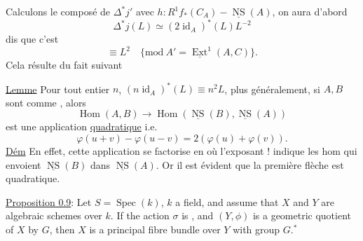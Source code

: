 Calculons  le composé  de $\Delta^*j'$ avec $h:R^1f_*(C_A)\mathbin{-}\underline{\operatorname{NS}}(A)$, on aura d'abord
\[
\Delta^*j(L)\simeq(2\operatorname{id}_A)^*(L)L^{-2}
\]
 dis que c'est
\[
\equiv L^2\quad\{\mathrm{mod}\ A'=\underline{\operatorname{Ext}}^1(A,C)\}.
\]
Cela résulte du fait suivant

\uline{Lemme} Pour tout entier $n$, $(n\operatorname{id}_A)^*(L)\equiv n^2L$,
 plus généralement, si $A,B$ sont comme , alors
\[
\operatorname{Hom}(A,B)\longrightarrow\operatorname{Hom}(\underline{\operatorname{NS}}(B),\underline{\operatorname{NS}}(A))
\]
est une application \uline{quadratique} i.e.
\[
\varphi(u+v)-\varphi(u-v)=2(\varphi(u)+\varphi(v)).
\]
 \uline{Dém} En effet, cette application se factorise en
où l'exposant ! indique les hom qui envoient $\underline{\operatorname{NS}}(B)$ dans $\underline{\operatorname{NS}}(A)$.  Or il est évident que la première flèche est quadratique.




\uline{Proposition 0.9}: Let $S=\operatorname{Spec}(k)$, $k$ a field, and assume that
$X$ and $Y$ are algebraic schemes over $k$. If the action $\sigma$ is
,
and $(Y,\phi)$ is a geometric quotient of $X$ by $G$, then $X$ is a principal fibre bundle over $Y$ with group $G$.${}^*$

